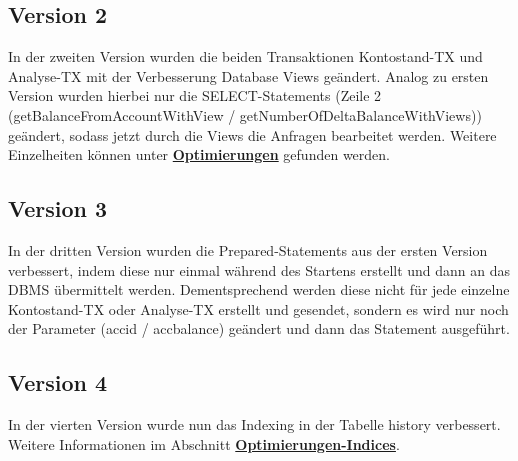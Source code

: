 \subsection{Version 2}\label{subsec:version2}
In der zweiten Version wurden die beiden Transaktionen Kontostand-TX und Analyse-TX mit der Verbesserung Database Views geändert.
Analog zu ersten Version wurden hierbei nur die SELECT-Statements (Zeile 2 (getBalanceFromAccountWithView / getNumberOfDeltaBalanceWithViews)) geändert, sodass jetzt durch die Views die Anfragen bearbeitet werden.
Weitere Einzelheiten können unter \hyperref[sec:optimierungen]{\textbf{Optimierungen}} gefunden werden.



\subsection{Version 3}\label{subsec:version3}
In der dritten Version wurden die Prepared-Statements aus der ersten Version verbessert, indem diese nur einmal während des Startens erstellt und dann an das DBMS übermittelt werden.
Dementsprechend werden diese nicht für jede einzelne Kontostand-TX oder Analyse-TX erstellt und gesendet, sondern es wird nur noch der Parameter (accid / accbalance) geändert und dann das Statement ausgeführt.




\subsection{Version 4}\label{subsec:version4}
In der vierten Version wurde nun das Indexing in der Tabelle history verbessert.
Weitere Informationen im Abschnitt \hyperref[sec:optimierungen]{\textbf{Optimierungen-Indices}}.

